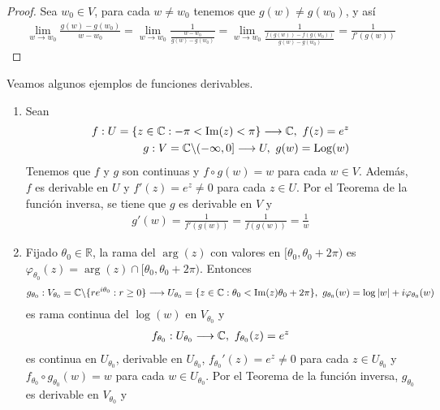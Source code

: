 \begin{proof}
    Sea $w_0 \in V$, para cada $w \not = w_0$ tenemos que $g(w) \not = g(w_0)$, y así
    \begin{align*}
        \lim_{w \to w_0}{\frac{g(w) - g(w_0)}{w - w_0}} = \lim_{w \to w_0}{\frac{1}{\frac{w - w_0}{g(w) - g(w_0)}}} = \lim_{w \to w_0}{\frac{1}{\frac{f(g(w)) - f(g(w_0))}{g(w) - g(w_0)}}} = \frac{1}{f'(g(w))}
    \end{align*}
\end{proof}

\begin{ejemplo}
    Veamos algunos ejemplos de funciones derivables.
    \begin{enumerate}
        \item Sean
              \begin{align*}
                  f : U = \{ z \in \mathbb{C} : -\pi < \text{Im}(z) < \pi\} \longrightarrow \mathbb{C}, \ f(z) = e^z \\
                  g : V = \mathbb{C} \backslash (-\infty,0] \longrightarrow U, \ g(w) = \text{Log}(w)
              \end{align*}
              Tenemos que $f$ y $g$ son continuas y $f \circ g (w) = w$ para cada $w \in V$. Además, $f$ es derivable en $U$ y $f'(z) = e^z \not = 0$ para cada $z \in U$. Por el Teorema de la función inversa, se tiene que $g$ es derivable en $V$ y
              \begin{align*}
                  g'(w) = \frac{1}{f'(g(w))} = \frac{1}{f(g(w))} = \frac{1}{w}
              \end{align*}
        \item Fijado $\theta_0 \in \mathbb{R}$, la rama del $\arg(z)$ con valores en $[\theta_0,\theta_0 +2\pi)$ es $\varphi_{\theta_0}(z) = \arg(z) \cap [\theta_0,\theta_0 +2\pi)$. Entonces
              \begin{align*}
                  g_{\theta_0} : V_{\theta_0} = \mathbb{C} \backslash \{ re^{i\theta_0} : r \ge 0 \} \longrightarrow U_{\theta_0} = \{ z \in \mathbb{C} : \theta_0 < \text{Im}(z) \theta_0 + 2\pi \}, \ g_{\theta_0}(w) = \log|w| + i\varphi_{\theta_0}(w)
              \end{align*}
              es rama continua del $\log(w)$ en $V_{\theta_0}$ y
              \begin{align*}
                  f_{\theta_0} : U_{\theta_0} \longrightarrow \com, \ f_{\theta_0}(z) = e^z
              \end{align*}
              es continua en $U_{\theta_0}$, derivable en $U_{\theta_0}$, $f_{\theta_0}'(z) = e^z \not = 0$ para cada $z \in U_{\theta_0}$ y $f_{\theta_0} \circ g_{\theta_0}(w) = w$ para cada $w \in U_{\theta_0}$. Por el Teorema de la función inversa, $g_{\theta_0}$ es derivable en $V_{\theta_0}$ y

\end{enumerate}
\end{ejemplo}
